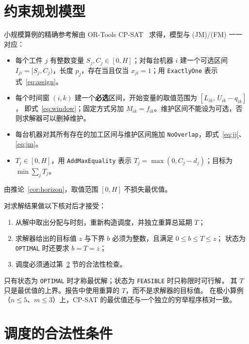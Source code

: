 \documentclass[11pt,oneside,notitlepage]{ctexrep}
\theoremstyle{definition}
\theoremstyle{remark}
\begin{document}
\section{约束规划模型}\label{sec:cpsat}

小规模算例的精确参考解由 OR-Tools CP-SAT~\cite{ortools} 求得，模型与 (JM)/(FM) 一一对应：
\begin{itemize}[nosep]
  \item 每个工件 $j$ 有整数变量 $S_j,C_j\in[0,H]$；对每台机器 $i$ 建一个可选区间
        $I_{ji}=[S_j,C_j)$，长度 $p_j$，存在当且仅当 $x_{ji}=1$；用 \texttt{ExactlyOne} 表示式~\eqref{eq:assign}。
  \item 每个时间窗 $(i,k)$ 建一个\textbf{必选}区间，开始变量的取值范围为 $[L_{ik},\,U_{ik}-q_{ik}]$，
        即式~\eqref{eq:window}；固定方式另加 $M_{ik}=f_{ik}$。维护区间不能设为可选，否则求解器可以删掉维护。
  \item 每台机器对其所有存在的加工区间与维护区间施加 \texttt{NoOverlap}，即式~\eqref{eq:jj}、\eqref{eq:jm}。
  \item $T_j\in[0,H]$，用 \texttt{AddMaxEquality} 表示 $T_j=\max(0,C_j-d_j)$；目标为 $\min\sum_jT_j$。
\end{itemize}
由推论~\ref{cor:horizon}，取值范围 $[0,H]$ 不损失最优值。

对求解结果做以下核对后才接受：
\begin{enumerate}[nosep]
  \item 从解中取出分配与时刻，重新构造调度，并独立重算总延期 $T$；
  \item 求解器给出的目标值 $z$ 与下界 $b$ 必须为整数，且满足 $0\le b\le T\le z$；
        状态为 \texttt{OPTIMAL} 时还要求 $b=T=z$；
  \item 调度必须通过第~\ref{sec:checker} 节的合法性检查。
\end{enumerate}
只有状态为 \texttt{OPTIMAL} 时才称最优解；状态为 \texttt{FEASIBLE} 时只称限时可行解，
其 $T$ 只是最优值的上界。报告中使用重算的 $T$，而不是求解器的目标值。
在极小算例（$n\le 5$、$m\le 3$）上，CP-SAT 的最优值还与一个独立的穷举程序核对一致。

\section{调度的合法性条件}\label{sec:checker}
\end{document}
